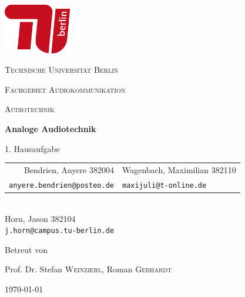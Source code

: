 \begin{titlepage}
    \centering
    \includegraphics[height=62pt]{tu_red.png}\par
    {\scshape\huge Technische Universität Berlin \par}
    {\scshape\Large Fachgebiet Audiokommunikation\par}
    \vspace{1.5cm}
    {\scshape\LARGE Audiotechnik\par}
    \vspace{1.5cm}

    {\Huge\bfseries {Analoge Audiotechnik}\par}
    \vspace{0.1cm}
    {\large 1. Hausaufgabe\par}
    \vspace{1cm}

    {\itshape
        \begin{tabular}{rl}
          Bendrien, Anyere 382004 &
          Wagenbach, Maximilian 382110 \\
          \vspace{0.2cm}
          \small \texttt{anyere.bendrien@posteo.de} &
          \small \texttt{maxijuli@t-online.de}
        \end{tabular}\\
        Horn, Jason 382104 \\
        \small \texttt{j.horn@campus.tu-berlin.de} 
    }
    \vfill
    
    Betreut von\par
    Prof. Dr. Stefan \textsc{Weinzierl}, Roman \textsc{Gebhardt}
    \vspace{1cm}
    
    {\large \today\par}
\end{titlepage}